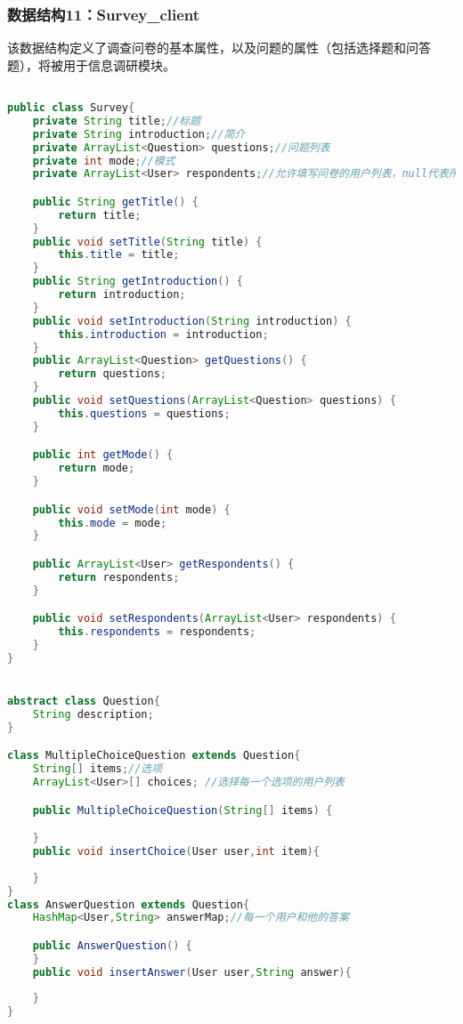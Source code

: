 {\color{red}

\subsubsection{数据结构11：Survey\_client}
该数据结构定义了调查问卷的基本属性，以及问题的属性（包括选择题和问答题），将被用于信息调研模块。
\begin{lstlisting}[language=Java, caption=Survey定义]

public class Survey{
    private String title;//标题
    private String introduction;//简介
    private ArrayList<Question> questions;//问题列表
    private int mode;//模式
    private ArrayList<User> respondents;//允许填写问卷的用户列表，null代表所有人

    public String getTitle() {
        return title;
    }
    public void setTitle(String title) {
        this.title = title;
    }
    public String getIntroduction() {
        return introduction;
    }
    public void setIntroduction(String introduction) {
        this.introduction = introduction;
    }
    public ArrayList<Question> getQuestions() {
        return questions;
    }
    public void setQuestions(ArrayList<Question> questions) {
        this.questions = questions;
    }

    public int getMode() {
        return mode;
    }

    public void setMode(int mode) {
        this.mode = mode;
    }

    public ArrayList<User> getRespondents() {
        return respondents;
    }

    public void setRespondents(ArrayList<User> respondents) {
        this.respondents = respondents;
    }   
}


abstract class Question{
    String description;
}

class MultipleChoiceQuestion extends Question{
    String[] items;//选项
    ArrayList<User>[] choices; //选择每一个选项的用户列表

    public MultipleChoiceQuestion(String[] items) {

    }
    public void insertChoice(User user,int item){
        
    }   
}
class AnswerQuestion extends Question{
    HashMap<User,String> answerMap;//每一个用户和他的答案

    public AnswerQuestion() {
    }
    public void insertAnswer(User user,String answer){
        
    }
}
\end{lstlisting}

}
